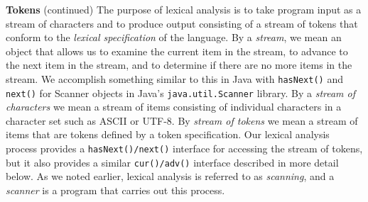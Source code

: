 \begin{minipage}[t]{\sw}
\slidenumber
\LARGE
{\bf Tokens} (continued)\exx
The purpose of lexical analysis is to take program input
as a stream of characters and to produce output consisting
of a stream of tokens that conform
to the {\em lexical specification} of the language.\exx
By a {\em stream}, we mean an object that allows us
to examine the current item in the stream,
to advance to the next item in the stream,
and to determine if there are no more items in the stream.
We accomplish something similar to this in Java
with \verb'hasNext()' and \verb'next()' for Scanner objects
in Java's \verb'java.util.Scanner' library.\exx
By a {\em stream of characters}
we mean a stream of items consisting of individual characters
in a character set such as ASCII or UTF-8.
By {\em stream of tokens} we mean
a stream of items that are tokens defined by a token specification.
Our lexical analysis process provides
a \verb'hasNext()/next()' interface
for accessing the stream of tokens,
but it also provides a similar \verb'cur()/adv()' interface
described in more detail below.\exx
As we noted earlier,
lexical analysis is referred to as {\em scanning},
and a {\em scanner} is a program that carries out this process.\exx
\end{minipage}
\clearpage
